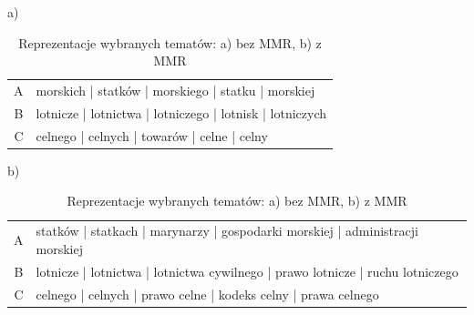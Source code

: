 	\begin{table}[htb]
		\caption{Reprezentacje wybranych tematów: a) bez MMR, b) z MMR}\label{tab:mmr} %
		\centering
		a) %
		\begin{tabularx}{.9\textwidth}{rl}
			\toprule
			A	&	morskich | statków | morskiego | statku | morskiej	\\ 
			B	&	lotnicze | lotnictwa | lotniczego | lotnisk | lotniczych	\\ 
			C	&	celnego | celnych | towarów | celne | celny	\\
			\midrule
		\end{tabularx}

		b) %
		\begin{tabularx}{.9\textwidth}{rl}
			A	&	statków | statkach | marynarzy | gospodarki morskiej | administracji morskiej	\\ 
			B	&	lotnicze | lotnictwa | lotnictwa cywilnego | prawo lotnicze | ruchu lotniczego \\ 
			C	&	celnego | celnych | prawo celne | kodeks celny | prawa celnego \\
			\bottomrule
		\end{tabularx}
	\end{table}